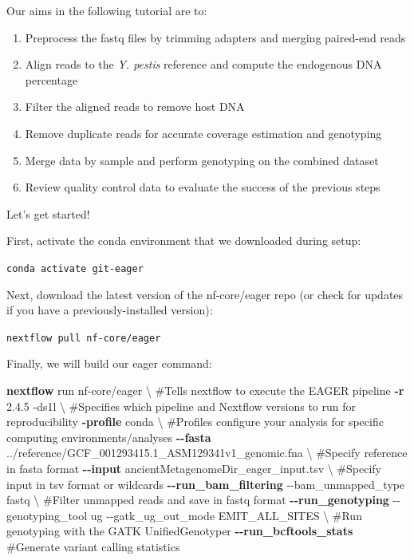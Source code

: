 \documentclass[
  letterpaper,
]{book}
\newenvironment{Shaded}{}{}
\newcommand{\AttributeTok}[1]{\textcolor[rgb]{0.84,0.23,0.29}{#1}}
\newcommand{\CommentTok}[1]{\textcolor[rgb]{0.42,0.45,0.49}{#1}}
\newcommand{\DataTypeTok}[1]{\textcolor[rgb]{0.84,0.23,0.29}{#1}}
\newcommand{\ExtensionTok}[1]{\textcolor[rgb]{0.84,0.23,0.29}{\textbf{#1}}}
\newcommand{\NormalTok}[1]{\textcolor[rgb]{0.14,0.16,0.18}{#1}}
\providecommand{\tightlist}{%
  \setlength{\itemsep}{0pt}\setlength{\parskip}{0pt}}\usepackage{longtable,booktabs,array}
\begin{document}
Our aims in the following tutorial are to:

\begin{enumerate}
\def\labelenumi{\arabic{enumi}.}
\tightlist
\item
  Preprocess the fastq files by trimming adapters and merging paired-end
  reads
\item
  Align reads to the \emph{Y. pestis} reference and compute the
  endogenous DNA percentage
\item
  Filter the aligned reads to remove host DNA
\item
  Remove duplicate reads for accurate coverage estimation and genotyping
\item
  Merge data by sample and perform genotyping on the combined dataset
\item
  Review quality control data to evaluate the success of the previous
  steps
\end{enumerate}

Let's get started!

First, activate the conda environment that we downloaded during setup:

\texttt{conda\ activate\ git-eager}

Next, download the latest version of the nf-core/eager repo (or check
for updates if you have a previously-installed version):

\texttt{nextflow\ pull\ nf-core/eager}

Finally, we will build our eager command:

\begin{Shaded}
\begin{Highlighting}[]
\ExtensionTok{nextflow}\NormalTok{ run nf{-}core/eager }\DataTypeTok{\textbackslash{} }\NormalTok{\#Tells nextflow to execute the EAGER pipeline}
\ExtensionTok{{-}r}\NormalTok{ 2.4.5 }\AttributeTok{{-}ds1l} \DataTypeTok{\textbackslash{} }\NormalTok{\#Specifies which pipeline and Nextflow versions to run for reproducibility}
\ExtensionTok{{-}profile}\NormalTok{ conda  }\DataTypeTok{\textbackslash{} }\NormalTok{\#Profiles configure your analysis for specific computing environments/analyses}
\ExtensionTok{{-}{-}fasta}\NormalTok{ ../reference/GCF\_001293415.1\_ASM129341v1\_genomic.fna }\DataTypeTok{\textbackslash{} }\NormalTok{\#Specify reference in fasta format}
\ExtensionTok{{-}{-}input}\NormalTok{ ancientMetagenomeDir\_eager\_input.tsv }\DataTypeTok{\textbackslash{} }\NormalTok{\#Specify input in tsv format or wildcards}
\ExtensionTok{{-}{-}run\_bam\_filtering} \AttributeTok{{-}{-}bam\_unmapped\_type}\NormalTok{ fastq }\DataTypeTok{\textbackslash{} }\NormalTok{\#Filter unmapped reads and save in fastq format}
\ExtensionTok{{-}{-}run\_genotyping} \AttributeTok{{-}{-}genotyping\_tool}\NormalTok{ ug }\AttributeTok{{-}{-}gatk\_ug\_out\_mode}\NormalTok{ EMIT\_ALL\_SITES }\DataTypeTok{\textbackslash{} }\NormalTok{\#Run genotyping with the GATK UnifiedGenotyper}
\ExtensionTok{{-}{-}run\_bcftools\_stats} \CommentTok{\#Generate variant calling statistics}
\end{Highlighting}
\end{Shaded}
\end{document}
